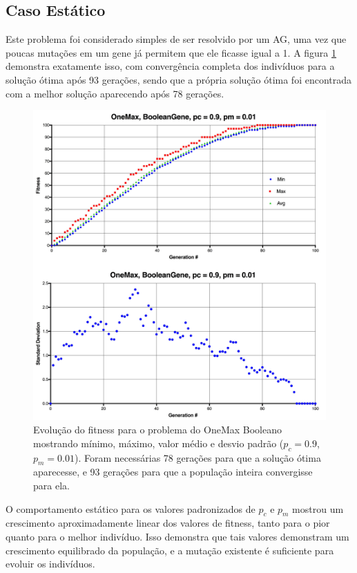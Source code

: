 \subsection{Caso Estático}

Este problema foi considerado simples de ser resolvido por um AG, uma vez que poucas mutações em um gene já permitem que ele ficasse igual a 1. A figura \ref{fig:onemax_boolean} demonstra exatamente isso, com convergência completa dos indivíduos para a solução ótima após 93 gerações, sendo que a própria solução ótima foi encontrada com a melhor solução aparecendo após 78 gerações.

\begin{figure}[ht!]
    \centering \includegraphics[width=1.0\textwidth]{onemax_boolean.jpg}
    \caption{Evolução do fitness para o problema do OneMax Booleano mostrando mínimo, máximo, valor médio e desvio padrão ($p_c=0.9$, $p_m=0.01$). Foram necessárias 78 gerações para que a solução ótima aparecesse, e 93 gerações para que a população inteira convergisse para ela.}
    \label{fig:onemax_boolean}
\end{figure}

O comportamento estático para os valores padronizados de $p_c$ e $p_m$ mostrou um crescimento aproximadamente linear dos valores de fitness, tanto para o pior quanto para o melhor indivíduo. Isso demonstra que tais valores demonstram um crescimento equilibrado da população, e a mutação existente é suficiente para evoluir os indivíduos.

